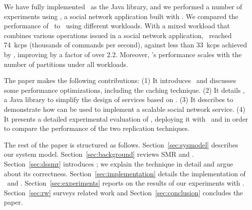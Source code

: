 We have fully implemented \dssmr\ as the \libname{} Java library, and we performed a number of experiments using \appname{}, a social network application built with \libname{}.
We compared the performance of \dssmr\ to \ssmr\ using different workloads.
With a mixed workload that combines various operations issued in a social network application, \dssmr\ reached 74~kcps (thousands of commands per second), against less than 33~kcps achieved by \ssmr{}, improving by a factor of over 2.2.
Moreover, \dssmr's performance scales with the number of partitions under all workloads.

The paper makes the following contributions:
(1) It introduces \dssmr\ and discusses some performance optimizations, including the caching technique. 
(2) It details \libname{}, a Java library to simplify the design of services based on \dssmr{}.
(3) It describes \appname{} to demonstrate how \libname{} can be used to implement a scalable social network service.
(4) It presents a detailed experimental evaluation of \appname{}, deploying it with \ssmr\ and \dssmr{} in order to compare the performance of the two replication techniques.

The rest of the paper is structured as follows.
Section~\ref{sec:sysmodel} describes our system model.
Section~\ref{sec:background} reviews SMR and \ssmrshort{}.
Section~\ref{sec:dssmr} introduces \dssmr{}; we explain the technique in detail and argue about its correctness.
Section~\ref{sec:implementation} details the implementation of \libname\ and \appname{}.
Section~\ref{sec:experiments} reports on the results of our experiments with \dssmr{}.
Section~\ref{sec:rw} surveys related work and
Section~\ref{sec:conclusion} concludes the paper.





